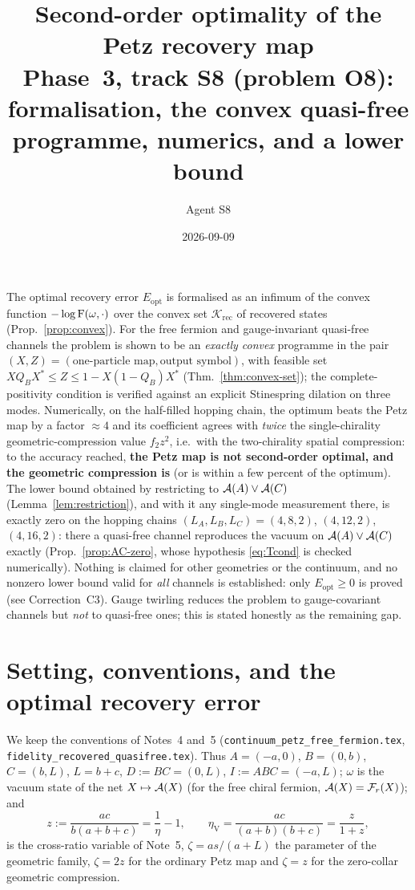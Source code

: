\documentclass[11pt]{article}
\title{Second-order optimality of the Petz recovery map\\
\large Phase~3, track S8 (problem O8): formalisation, the convex quasi-free
programme, numerics, and a lower bound}
\author{Agent S8}
\date{2026-09-09}
\newcommand{\Erec}{E_{\mathrm{opt}}}
\newcommand{\Krec}{\mathcal K_{\mathrm{rec}}}
\begin{document}
\maketitle

\begin{tcolorbox}[colback=navy!5,colframe=navy!60,title={\bfseries Summary},fonttitle=\small]
The optimal recovery error \(\Erec\) is formalised as an infimum of the convex
function \(-\log\operatorname{F}(\omega,\cdot)\) over the convex set \(\Krec\) of recovered
states (Prop.~\ref{prop:convex}).  For the free fermion and gauge-invariant
quasi-free channels the problem is shown to be an \emph{exactly convex}
programme in the pair \((X,Z)=(\text{one-particle map},\text{output symbol})\),
with feasible set \(XQ_BX^*\le Z\le 1-X(1-Q_B)X^*\) (Thm.~\ref{thm:convex-set});
the complete-positivity condition is verified against an explicit Stinespring
dilation on three modes.  Numerically, on the half-filled hopping chain, the
optimum beats the Petz map by a factor \(\approx4\) and its coefficient agrees
with \emph{twice} the single-chirality geometric-compression value
\(f_2z^2\), i.e.\ with the two-chirality spatial compression: to the accuracy
reached, \textbf{the Petz map is not second-order optimal, and the geometric
compression is} (or is within a few percent of the optimum).  The lower bound
obtained by restricting to \(\mathcal A(A)\vee\mathcal A(C)\) (Lemma~\ref{lem:restriction}), and with it any single-mode measurement there, is exactly zero on the hopping chains \((L_A,L_B,L_C)=(4,8,2)\), \((4,12,2)\), \((4,16,2)\): there a quasi-free channel reproduces the vacuum on \(\mathcal A(A)\vee\mathcal A(C)\) exactly (Prop.~\ref{prop:AC-zero}, whose hypothesis \eqref{eq:Tcond} is checked numerically).
Nothing is claimed for other geometries or the continuum, and no nonzero lower bound valid for \emph{all} channels is established:
only \(\Erec\ge0\) is proved (see Correction~C3).  Gauge twirling reduces the problem to
gauge-covariant channels but \emph{not} to quasi-free ones; this is stated
honestly as the remaining gap.
\end{tcolorbox}

\tableofcontents
\clearpage

\section{Setting, conventions, and the optimal recovery error}\label{sec:setting}

We keep the conventions of Notes~4 and~5 (\texttt{continuum\_petz\_free\_fermion.tex},
\texttt{fidelity\_recovered\_quasifree.tex}).  Thus \(A=(-a,0)\), \(B=(0,b)\),
\(C=(b,L)\), \(L=b+c\), \(D:=BC=(0,L)\), \(I:=ABC=(-a,L)\); \(\omega\) is the
vacuum state of the net \(X\mapsto\mathcal A(X)\) (for the free chiral fermion,
\(\mathcal A(X)=\mathcal F_r(X)\)); and
\begin{equation}\label{eq:zdef}
 z:=\frac{ac}{b(a+b+c)}=\frac1\eta-1,\qquad
 \eta_{\mathrm V}=\frac{ac}{(a+b)(b+c)}=\frac{z}{1+z},
\end{equation}
is the cross-ratio variable of Note~5, \(\zeta=as/(a+L)\) the parameter of the
geometric family, \(\zeta=2z\) for the ordinary Petz map and \(\zeta=z\) for the
zero-collar geometric compression.
\end{document}
